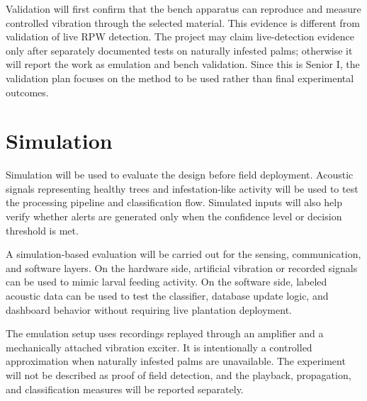 \documentclass[12pt,a4paper,oneside]{memoir}
\newcommand{\newrevision}[1]{\textcolor{green!45!black}{#1}}
\begin{document}
\newrevision{Validation will first confirm that the bench apparatus can reproduce and measure controlled vibration through the selected material. This evidence is different from validation of live RPW detection. The project may claim live-detection evidence only after separately documented tests on naturally infested palms; otherwise it will report the work as emulation and bench validation. Since this is Senior I, the validation plan focuses on the method to be used rather than final experimental outcomes.}

\section{Simulation}
\label{sec:Simulation}

Simulation will be used to evaluate the design before field deployment. Acoustic signals representing healthy trees and infestation-like activity will be used to test the processing pipeline and classification flow. Simulated inputs will also help verify whether alerts are generated only when the confidence level or decision threshold is met.

A simulation-based evaluation will be carried out for the sensing, communication, and software layers. On the hardware side, artificial vibration or recorded signals can be used to mimic larval feeding activity. On the software side, labeled acoustic data can be used to test the classifier, database update logic, and dashboard behavior without requiring live plantation deployment.

\newrevision{The emulation setup uses recordings replayed through an amplifier and a mechanically attached vibration exciter. It is intentionally a controlled approximation when naturally infested palms are unavailable. The experiment will not be described as proof of field detection, and the playback, propagation, and classification measures will be reported separately.}
\end{document}
